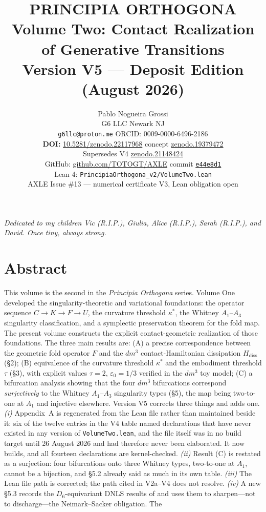 \documentclass[11pt]{article}
\title{\textbf{PRINCIPIA ORTHOGONA}\\[0.3em]
Volume Two: Contact Realization of Generative Transitions\\[0.3em]
\large Version V5 --- Deposit Edition (August 2026)}
\author{Pablo Nogueira Grossi\\
G6 LLC \textperiodcentered{} Newark NJ\\
\texttt{g6llc@proton.me} \textperiodcentered{} ORCID: 0009-0000-6496-2186\\
\small\textbf{DOI:} \href{https://doi.org/10.5281/zenodo.22117968}{10.5281/zenodo.22117968}
\textperiodcentered{} concept \href{https://doi.org/10.5281/zenodo.19379472}{zenodo.19379472}\\
\small Supersedes V4 \textperiodcentered{} \href{https://doi.org/10.5281/zenodo.21148424}{zenodo.21148424}\\
\small GitHub: \href{https://github.com/TOTOGT/AXLE}{github.com/TOTOGT/AXLE}
\textperiodcentered{} commit \href{https://github.com/TOTOGT/AXLE/tree/e44e8d1}{\texttt{e44e8d1}}\\
\small Lean 4: \texttt{PrincipiaOrthogona\_v2/VolumeTwo.lean}\\
\small AXLE Issue \#13 --- numerical certificate V3, Lean obligation open}
\date{}
\theoremstyle{boxed}
\begin{document}
\maketitle

\begin{center}\itshape
Dedicated to my children Vic (R.I.P.), Giulia, Alice (R.I.P.), Sarah (R.I.P.), and David. Once tiny, always strong.
\end{center}

\vspace{1em}

\section*{Abstract}

This volume is the second in the \emph{Principia Orthogona} series. Volume One developed
the singularity-theoretic and variational foundations: the operator sequence
$C \to K \to F \to U$, the curvature threshold $\kappa^{*}$, the Whitney $A_1$--$A_3$
singularity classification, and a symplectic preservation theorem for the fold map.
The present volume constructs the explicit contact-geometric realization of those
foundations. The three main results are:
(A) a precise correspondence between the geometric fold operator $F$ and the
$dm^3$ contact-Hamiltonian dissipation $H_{\mathrm{diss}}$ (\S 2);
(B) equivalence of the curvature threshold $\kappa^{*}$ and the embodiment
threshold $\tau$ (\S 3), with explicit values $\tau = 2$, $\varepsilon_0 = 1/3$
verified in the $dm^3$ toy model;
(C) a bifurcation analysis showing that the four $dm^3$ bifurcations correspond
\emph{surjectively} to the Whitney $A_1$--$A_3$ singularity types (\S 5), the map being
two-to-one at $A_1$ and injective elsewhere.
Version V5 corrects three things and adds one. \emph{(i)} Appendix~A is regenerated from
the Lean file rather than maintained beside it: six of the twelve entries in the V4 table named
declarations that have never existed in any version of \texttt{VolumeTwo.lean}, and the file itself
was in no build target until 26 August 2026 and had therefore never been elaborated. It now builds,
and all fourteen declarations are kernel-checked. \emph{(ii)} Result (C) is restated as a surjection:
four bifurcations onto three Whitney types, two-to-one at $A_1$, cannot be a bijection, and \S 5.2
already said as much in its own table. \emph{(iii)} The Lean file path is corrected; the path cited
in V2a--V4 does not resolve. \emph{(iv)} A new \S 5.3 records the $D_6$-equivariant DNLS results of
\cite{wp77} and uses them to sharpen---not to discharge---the Neimark--Sacker obligation. The
\end{document}

